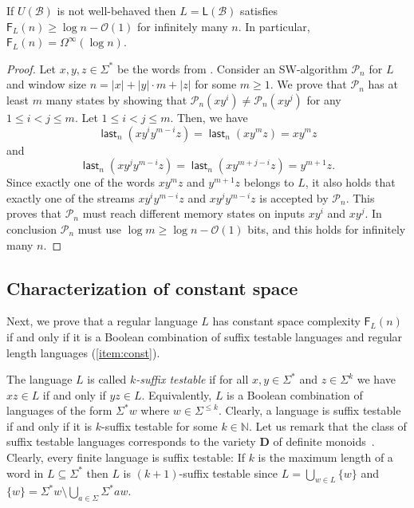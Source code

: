 \documentclass{article}\usepackage[a4paper,margin=20mm]{geometry}
\newcommand{\N}{\mathbb{N}}
\newcommand{\B}{\mathcal{B}}
\renewcommand{\O}{\mathcal{O}}
\renewcommand{\P}{\mathcal{P}}
\newcommand{\F}{\mathsf{F}}
\renewcommand{\L}{\mathsf{L}}
\DeclareMathOperator{\last}{\mathsf{last}}
\renewcommand{\geq}{\geqslant}
\renewcommand{\leq}{\leqslant}
\renewcommand{\ge}{\geq}
\renewcommand{\le}{\leq}
\newcommand{\Omegainf}{\Omega^{\scriptscriptstyle{\infty}}}
\begin{document}
\begin{proposition}
	\label{prop:logn-lb}
	If $U(\B)$ is not well-behaved then $L = \L(\B)$
	satisfies $\F_L(n) \geq \log n - \O(1)$ for infinitely many $n$.
	In particular, $\F_L(n) = \Omegainf(\log n)$.
\end{proposition}

\begin{proof}
	Let $x,y,z \in \Sigma^*$ be the words from .
	Consider an SW-algorithm $\P_n$ for $L$ and window size $n = |x| + |y| \cdot m + |z|$ for some $m \ge 1$.
	We prove that $\P_n$ has at least $m$ many states
	by showing that $\P_n(x y^i) \neq \P_n(x y^j)$ for any $1 \le i < j \le m$.
	Let $1 \le i < j \le m$.
	Then, we have
	\[
		\last_n(x y^i y^{m-i} z) = \last_n(x y^m z) = x y^m z
	\]
	and
	\[
		\last_n(x y^j y^{m-i} z) = \last_n(x y^{m+j-i} z) = y^{m+1} z.
	\]
	Since exactly one of the words $x y^m z$ and $y^{m+1} z$ belongs to $L$,
	it also holds that exactly one of the streams $x y^i y^{m-i} z$ and $x y^j y^{m-i} z$
	is accepted by $\P_n$.
	This proves that $\P_n$ must reach different memory states on inputs $x y^i$ and $x y^j$.
	In conclusion $\P_n$ must use $\log m \ge \log n - \O(1)$ bits, and this holds for infinitely many $n$.
\end{proof}


\subsection{Characterization of constant space}

\label{sec:char-const}

Next, we prove that a regular language $L$ has constant space complexity $\F_L(n)$
if and only if it is a Boolean combination of suffix testable languages
and regular length languages (\ref{item:const}).

The language $L$ is called {\em $k$-suffix testable}
if for all $x,y \in \Sigma^*$ and $z \in \Sigma^k$ we have
$xz \in L$ if and only if $yz \in L$.
Equivalently, $L$ is a Boolean combination of languages of the form $\Sigma^* w$ where $w \in \Sigma^{\le k}$.
Clearly, a language is suffix testable if and only if
it is $k$-suffix testable for some $k \in \N$.
Let us remark that the class of suffix testable languages corresponds to the variety
$\mathbf{D}$ of definite monoids~\cite{Straubing85}.
Clearly, every finite language
is suffix testable: If $k$ is the maximum length of a word in $L \subseteq \Sigma^*$ then $L$ is $(k+1)$-suffix testable
since $L = \bigcup_{w \in L} \{w\}$ and $\{w\} = \Sigma^* w \setminus \bigcup_{a \in \Sigma} \Sigma^*aw$. 
\end{document}
